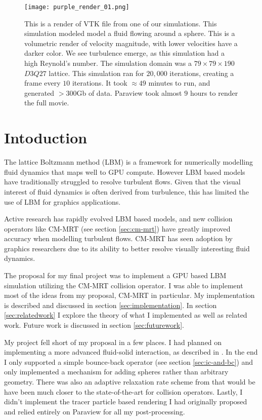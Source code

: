 \begin{figure*}
\begin{center}
  \texttt{[image: purple\_render\_01.png]}
\end{center}
\caption{
This is a render of VTK file from one of our simulations.
This simulation modeled model a fluid flowing around a sphere.
This is a volumetric render of velocity magnitude, with
lower velocities have a darker color.
We see turbulence emerge, as this simulation had a high Reynold's 
number.
The simulation domain was a $79 \times 79 \times 190$ 
$D3Q27$ lattice. 
This simulation ran for $20,000$ iterations,
  creating a frame every $10$ iterations.
It took $\approx 49$ minutes to run, 
and generated $> 300$Gb of data.
Paraview took almost $9$ hours to render the full movie.}
\label{fig:movie-frame}
\end{figure*}

\section{Intoduction}

The lattice Boltzmann method (LBM) 
is a framework for numerically modelling fluid dynamics
that maps well to GPU compute.
However LBM based models have traditionally struggled to 
resolve turbulent flows.
Given that the visual interest of fluid dynamics is often 
derived from turbulence, this has limited the use of LBM 
for graphics applications.

Active research has rapidly evolved LBM based models,
and new collision operators like CM-MRT (see section \ref{sec:cm-mrt})
have greatly improved accuracy when modelling turbulent flows.
CM-MRT has seen adoption by graphics 
researchers \cite{Li2020, Li2024, Lyu2021} due
to its ability to better resolve visually interesting
fluid dynamics.

The proposal for my final project was to
implement a GPU based LBM simulation utilizing the CM-MRT collision 
operator.
I was able to implement most of the ideas from
my proposal, CM-MRT in particular.
My implementation is described and discussed in section 
\ref{sec:implementation}.
In section \ref{sec:relatedwork} I explore the theory
of what I implemented as well as related work.
Future work is discussed in section \ref{sec:futurework}.


My project fell short of my proposal in a few places.
I had planned on implementing a more advanced fluid-solid
interaction, as described in \cite{Lyu2021}.
In the end I only supported a simple bounce-back operator 
(see section \ref{sec:ic-and-bc}) and only implemented a mechanism
for adding spheres rather than arbitrary geometry.
There was also an adaptive relaxation rate scheme from \cite{Li2020}
that would be have been much closer to the state-of-the-art for 
collision operators.
Lastly, I didn't implement the tracer particle based rendering
I had originally proposed and relied entirely on Paraview 
for all my post-processing.

